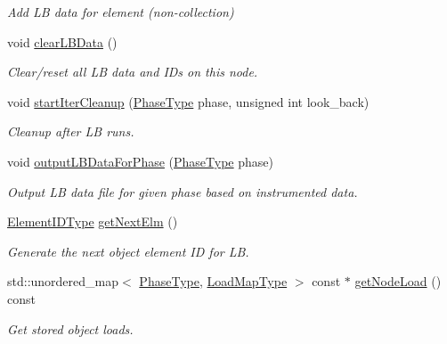 \begin{DoxyCompactItemize}
\begin{DoxyCompactList}\small\item\em Add LB data for element (non-\/collection) \end{DoxyCompactList}\item 
void \hyperlink{structvt_1_1vrt_1_1collection_1_1balance_1_1_node_l_b_data_aca420505505e0da3efd5388c7212d23d}{clear\+L\+B\+Data} ()
\begin{DoxyCompactList}\small\item\em Clear/reset all LB data and I\+Ds on this node. \end{DoxyCompactList}\item 
void \hyperlink{structvt_1_1vrt_1_1collection_1_1balance_1_1_node_l_b_data_aa12774fb241886e1995115af7d310564}{start\+Iter\+Cleanup} (\hyperlink{namespacevt_a46ce6733d5cdbd735d561b7b4029f6d7}{Phase\+Type} phase, unsigned int look\+\_\+back)
\begin{DoxyCompactList}\small\item\em Cleanup after LB runs. \end{DoxyCompactList}\item 
void \hyperlink{structvt_1_1vrt_1_1collection_1_1balance_1_1_node_l_b_data_ac3a71fde943f97688823f4dee9e87185}{output\+L\+B\+Data\+For\+Phase} (\hyperlink{namespacevt_a46ce6733d5cdbd735d561b7b4029f6d7}{Phase\+Type} phase)
\begin{DoxyCompactList}\small\item\em Output LB data file for given phase based on instrumented data. \end{DoxyCompactList}\item 
\hyperlink{namespacevt_1_1vrt_1_1collection_1_1balance_a592736f733df4f90856df90a1fd08905}{Element\+I\+D\+Type} \hyperlink{structvt_1_1vrt_1_1collection_1_1balance_1_1_node_l_b_data_a6802b9deda54d1b96280bff0431deab5}{get\+Next\+Elm} ()
\begin{DoxyCompactList}\small\item\em Generate the next object element ID for LB. \end{DoxyCompactList}\item 
std\+::unordered\+\_\+map$<$ \hyperlink{namespacevt_a46ce6733d5cdbd735d561b7b4029f6d7}{Phase\+Type}, \hyperlink{namespacevt_1_1vrt_1_1collection_1_1balance_a5339303db2e1ce964d783a53fd74e6b1}{Load\+Map\+Type} $>$ const  $\ast$ \hyperlink{structvt_1_1vrt_1_1collection_1_1balance_1_1_node_l_b_data_a6a1d3d7f8ae930f1d5f97fafc91e118c}{get\+Node\+Load} () const
\begin{DoxyCompactList}\small\item\em Get stored object loads. \end{DoxyCompactList}\item 

\end{DoxyCompactItemize}

